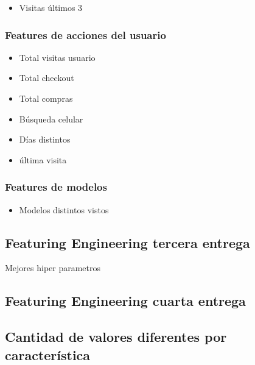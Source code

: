 \documentclass[a4paper ,12pt]{article}
\begin{document}
		
		
			\begin{itemize}
				\item Visitas últimos 3
			\end{itemize}





\subsubsection{Features de acciones del usuario}

	\begin{itemize}
		\item Total visitas usuario
		
		\item Total checkout
		
		\item Total compras
		
		\item Búsqueda celular 
		
		\item Días distintos 
		
		\item última visita 
		
	\end{itemize}
	


\subsubsection{Features de modelos}

	\begin{itemize}
		
		\item Modelos distintos vistos
			
	\end{itemize}	

\subsection{Featuring Engineering tercera entrega}

	Mejores hiper parametros

\subsection{Featuring Engineering cuarta entrega}

\subsection{Cantidad de valores diferentes por característica}
\end{document}
